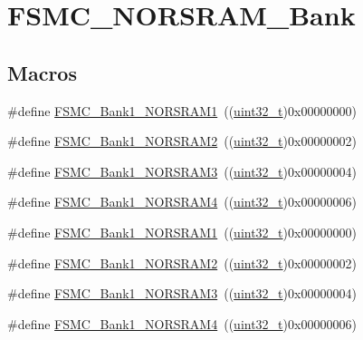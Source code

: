 \hypertarget{group___f_s_m_c___n_o_r_s_r_a_m___bank}{}\section{F\+S\+M\+C\+\_\+\+N\+O\+R\+S\+R\+A\+M\+\_\+\+Bank}
\label{group___f_s_m_c___n_o_r_s_r_a_m___bank}
\subsection*{Macros}
\begin{DoxyCompactItemize}
\item 
\#define \hyperlink{group___f_s_m_c___n_o_r_s_r_a_m___bank_ga514a05828041fa1a13d464c9e4a0a4a9}{F\+S\+M\+C\+\_\+\+Bank1\+\_\+\+N\+O\+R\+S\+R\+A\+M1}~((\hyperlink{_p_e___types_8h_a33594304e786b158f3fb30289278f5af}{uint32\+\_\+t})0x00000000)
\item 
\#define \hyperlink{group___f_s_m_c___n_o_r_s_r_a_m___bank_gaef52862c652370b9a658478d275dd956}{F\+S\+M\+C\+\_\+\+Bank1\+\_\+\+N\+O\+R\+S\+R\+A\+M2}~((\hyperlink{_p_e___types_8h_a33594304e786b158f3fb30289278f5af}{uint32\+\_\+t})0x00000002)
\item 
\#define \hyperlink{group___f_s_m_c___n_o_r_s_r_a_m___bank_ga151b02506a318ac77382b52f3b5e16f4}{F\+S\+M\+C\+\_\+\+Bank1\+\_\+\+N\+O\+R\+S\+R\+A\+M3}~((\hyperlink{_p_e___types_8h_a33594304e786b158f3fb30289278f5af}{uint32\+\_\+t})0x00000004)
\item 
\#define \hyperlink{group___f_s_m_c___n_o_r_s_r_a_m___bank_ga1083572834aa084d21e6698c280f8f74}{F\+S\+M\+C\+\_\+\+Bank1\+\_\+\+N\+O\+R\+S\+R\+A\+M4}~((\hyperlink{_p_e___types_8h_a33594304e786b158f3fb30289278f5af}{uint32\+\_\+t})0x00000006)
\item 
\#define \hyperlink{group___f_s_m_c___n_o_r_s_r_a_m___bank_ga514a05828041fa1a13d464c9e4a0a4a9}{F\+S\+M\+C\+\_\+\+Bank1\+\_\+\+N\+O\+R\+S\+R\+A\+M1}~((\hyperlink{_p_e___types_8h_a33594304e786b158f3fb30289278f5af}{uint32\+\_\+t})0x00000000)
\item 
\#define \hyperlink{group___f_s_m_c___n_o_r_s_r_a_m___bank_gaef52862c652370b9a658478d275dd956}{F\+S\+M\+C\+\_\+\+Bank1\+\_\+\+N\+O\+R\+S\+R\+A\+M2}~((\hyperlink{_p_e___types_8h_a33594304e786b158f3fb30289278f5af}{uint32\+\_\+t})0x00000002)
\item 
\#define \hyperlink{group___f_s_m_c___n_o_r_s_r_a_m___bank_ga151b02506a318ac77382b52f3b5e16f4}{F\+S\+M\+C\+\_\+\+Bank1\+\_\+\+N\+O\+R\+S\+R\+A\+M3}~((\hyperlink{_p_e___types_8h_a33594304e786b158f3fb30289278f5af}{uint32\+\_\+t})0x00000004)
\item 
\#define \hyperlink{group___f_s_m_c___n_o_r_s_r_a_m___bank_ga1083572834aa084d21e6698c280f8f74}{F\+S\+M\+C\+\_\+\+Bank1\+\_\+\+N\+O\+R\+S\+R\+A\+M4}~((\hyperlink{_p_e___types_8h_a33594304e786b158f3fb30289278f5af}{uint32\+\_\+t})0x00000006)
\end{DoxyCompactItemize}


